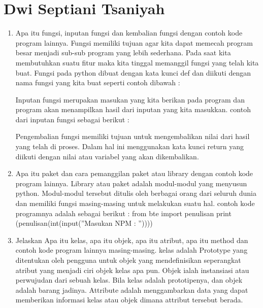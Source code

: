 \section{Dwi Septiani Tsaniyah}
\begin{enumerate}
    \item Apa itu fungsi, inputan fungsi dan kembalian fungsi dengan contoh kode program lainnya.
Fungsi memiliki tujuan agar kita dapat memecah program besar menjadi sub-sub program yang lebih sederhana. Pada saat kita membutuhkan suatu fitur maka kita tinggal memanggil fungsi yang telah kita buat. Fungsi pada python dibuat dengan kata kunci def dan diikuti dengan nama fungsi yang kita buat seperti contoh dibawah :
 

Inputan fungsi merupakan masukan yang kita berikan pada program dan program akan menampilkan hasil dari inputan yang kita masukkan. contoh dari inputan fungsi sebagai berikut :
 
Pengembalian fungsi memiliki tujuan untuk mengembalikan nilai dari hasil yang telah di proses. Dalam hal ini menggunakan kata kunci return yang diikuti dengan nilai atau variabel yang akan dikembalikan.
 

    \item Apa itu paket dan cara pemanggilan paket atau library dengan contoh kode program lainnya.
Library atau paket adalah modul-modul yang menyusun python. Modul-modul tersebut ditulis oleh berbagai orang dari seluruh dunia dan memiliki fungsi masing-masing untuk melakukan suatu hal. contoh kode programnya adalah sebagai berikut : from bte import penulisan print (penulisan(int(input(''Masukan NPM : ''))))
 

    \item Jelaskan Apa itu kelas, apa itu objek, apa itu atribut, apa itu method dan contoh kode program lainnya masing-masing.
kelas adalah Prototype yang ditentukan oleh pengguna untuk objek yang mendefinisikan seperangkat atribut yang menjadi ciri objek kelas apa pun. Objek ialah instansiasi atau perwujudan dari sebuah kelas. Bila kelas adalah prototipenya, dan objek adalah barang jadinya. Attribute adalah menggambarkan data yang dapat memberikan informasi kelas atau objek dimana attribut tersebut berada.
 


\end{enumerate}
